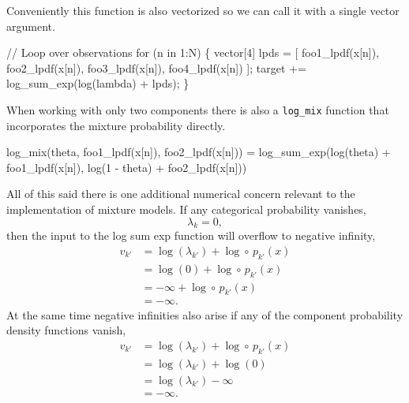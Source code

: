 \documentclass[
  letterpaper,
  DIV=11,
  numbers=noendperiod]{scrartcl}
\newenvironment{Shaded}{\begin{snugshade}}{\end{snugshade}}
\newcommand{\CommentTok}[1]{\textcolor[rgb]{0.37,0.37,0.37}{#1}}
\newcommand{\ControlFlowTok}[1]{\textcolor[rgb]{0.00,0.23,0.31}{#1}}
\newcommand{\DataTypeTok}[1]{\textcolor[rgb]{0.68,0.00,0.00}{#1}}
\newcommand{\DecValTok}[1]{\textcolor[rgb]{0.68,0.00,0.00}{#1}}
\newcommand{\KeywordTok}[1]{\textcolor[rgb]{0.00,0.23,0.31}{#1}}
\newcommand{\NormalTok}[1]{\textcolor[rgb]{0.00,0.23,0.31}{#1}}
\begin{document}
Conveniently this function is also vectorized so we can call it with a
single vector argument.

\begin{Shaded}
\begin{Highlighting}[]
\CommentTok{// Loop over observations}
\ControlFlowTok{for}\NormalTok{ (n }\ControlFlowTok{in} \DecValTok{1}\NormalTok{:N) \{}
  \DataTypeTok{vector}\NormalTok{[}\DecValTok{4}\NormalTok{] lpds = [ foo1\_lpdf(x[n]), foo2\_lpdf(x[n]),}
\NormalTok{                     foo3\_lpdf(x[n]), foo4\_lpdf(x[n]) ]\textquotesingle{};}
  \KeywordTok{target +=}\NormalTok{ log\_sum\_exp(log(lambda) + lpds);}
\NormalTok{\}}
\end{Highlighting}
\end{Shaded}

When working with only two components there is also a \texttt{log\_mix}
function that incorporates the mixture probability directly.

\begin{Shaded}
\begin{Highlighting}[]
\NormalTok{log\_mix(theta, foo1\_lpdf(x[n]), foo2\_lpdf(x[n]))}
\NormalTok{=}
\NormalTok{log\_sum\_exp(log(theta)     + foo1\_lpdf(x[n]),}
\NormalTok{            log(}\DecValTok{1}\NormalTok{ {-} theta) + foo2\_lpdf(x[n]))}
\end{Highlighting}
\end{Shaded}

All of this said there is one additional numerical concern relevant to
the implementation of mixture models. If any categorical probability
vanishes, \[
\lambda_{k} = 0,
\] then the input to the log sum exp function will overflow to negative
infinity, \begin{align*}
v_{k'}
&=
\log(\lambda_{k'}) + \log \circ \, p_{k'} (x)
\\
&=
\log(0) + \log \circ \, p_{k'} (x)
\\
&=
-\infty + \log \circ \, p_{k'} (x)
\\
&=
-\infty.
\end{align*} At the same time negative infinities also arise if any of
the component probability density functions vanish, \begin{align*}
v_{k'}
&=
\log(\lambda_{k'}) + \log \circ \, p_{k'} (x)
\\
&=
\log(\lambda_{k'}) + \log(0)
\\
&=
\log(\lambda_{k'}) -\infty
\\
&=
-\infty.
\end{align*}
\end{document}
